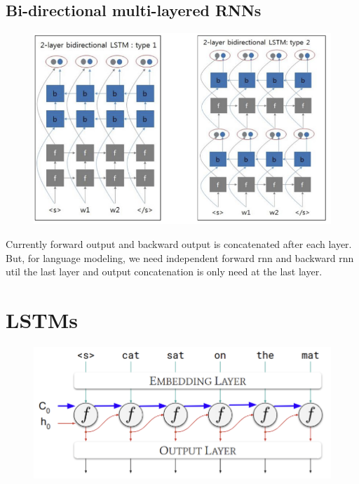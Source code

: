 \documentclass[11pt]{article}
\begin{document}
\subsection{Bi-directional multi-layered RNNs}

\begin{figure}[H]
    \centering
    \includegraphics[width=\linewidth]{figures/bi-directional-multi-layered-rnn.png}
\end{figure}

Currently forward output and backward output is concatenated after each layer. But, for language modeling, we need independent forward rnn and backward rnn util the last layer and output concatenation is only need at the last layer.

\section{LSTMs}

\begin{figure}[H]
    \centering
    \includegraphics[width=\linewidth]{figures/lstm.png}
\end{figure}
\end{document}
